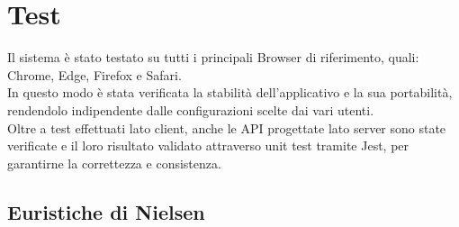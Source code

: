 \section{Test}
Il sistema è stato testato su tutti i principali Browser di riferimento, quali: Chrome, Edge, Firefox e Safari.\\
In questo modo è stata verificata la stabilità dell’applicativo e la sua portabilità, rendendolo indipendente dalle
configurazioni scelte dai vari utenti.\\ Oltre a test effettuati lato client, anche le API progettate lato server sono
state verificate e il loro risultato validato attraverso unit test tramite Jest, per garantirne la correttezza e consistenza.
\subsection{Euristiche di Nielsen}

